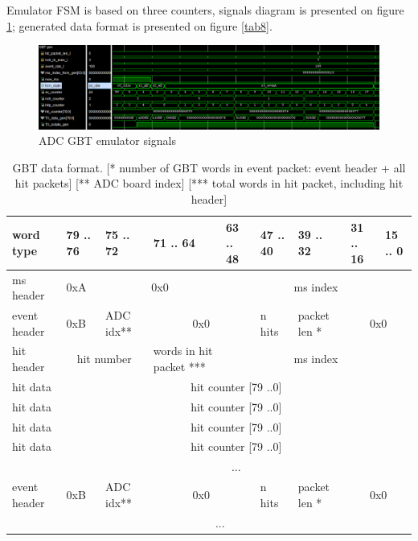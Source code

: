 \documentclass{article}
\begin{document}
Emulator FSM is based on three counters, signals diagram is presented on figure \ref{fig:9}; generated data format is presented on figure \ref{tab8}.

\begin{figure}[H]
	\centering 
	\includegraphics[width=1.0\textwidth]{ADC_GBT_emu_waves.png}
	\caption{\label{fig:9} ADC GBT emulator signals}
\end{figure}

\begin{table}[H]
\centering
\begin{tabular}{| l | l | l | l | l | l | l | l | l |}
\hline
word type & 79 .. 76 & 75 .. 72 & 71 .. 64 & 63 .. 48 & 47 .. 40 & 39 .. 32 & 31 .. 16 & 15 .. 0 \\ \hline
ms header & 0xA & \multicolumn{2}{c|}{0x0}  & \multicolumn{5}{c|}{ms index} \\ \hline
event header & 0xB & ADC idx** & \multicolumn{2}{c|}{0x0} & n hits & packet len * & \multicolumn{2}{c|}{0x0} \\ \hline
hit header & \multicolumn{2}{c|}{hit number} & words in hit packet *** & \multicolumn{5}{c|}{ms index} \\ \hline
hit data & \multicolumn{8}{c|}{hit counter [79 ..0]} \\ \hline
hit data & \multicolumn{8}{c|}{hit counter [79 ..0]} \\ \hline
hit data & \multicolumn{8}{c|}{hit counter [79 ..0]} \\ \hline
hit data & \multicolumn{8}{c|}{hit counter [79 ..0]} \\ \hline
  & \multicolumn{8}{c|}{ ... } \\ \hline

event header & 0xB & ADC idx** & \multicolumn{2}{c|}{0x0} & n hits & packet len * & \multicolumn{2}{c|}{0x0} \\ \hline
  & \multicolumn{7}{c|}{ ... } \\ \hline

\end{tabular}
\caption{GBT data format. [* number of GBT words in event packet: event header + all hit packets] [** ADC board index] [*** total words in hit packet, including hit header]\label{tab10}}
\end{table}
\end{document}
